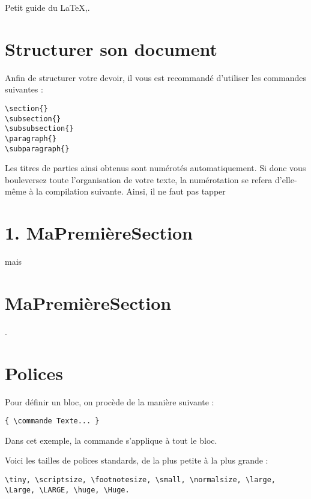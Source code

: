 Petit guide du LaTeX,.

\section{Structurer son document}
Anfin de structurer votre devoir, il vous est recommandé d'utiliser les commandes suivantes :
\begin{verbatim}
\section{}
\subsection{}
\subsubsection{}
\paragraph{}
\subparagraph{}
\end{verbatim}
Les titres de parties ainsi obtenus sont numérotés automatiquement. Si donc vous bouleversez toute l'organisation de votre texte, la numérotation se refera d'elle-même à la compilation suivante. Ainsi, il ne faut pas tapper \section{1. MaPremièreSection} mais \section{MaPremièreSection}.

\section{Polices}
Pour définir un bloc, on procède de la manière suivante :
\begin{verbatim}
{ \commande Texte... }
\end{verbatim}
Dans cet exemple, la commande s'applique à tout le bloc.

Voici les tailles de polices standards, de la plus petite à la plus grande :
\begin{verbatim}
\tiny, \scriptsize, \footnotesize, \small, \normalsize, \large, \Large, \LARGE, \huge, \Huge.
\end{verbatim}

